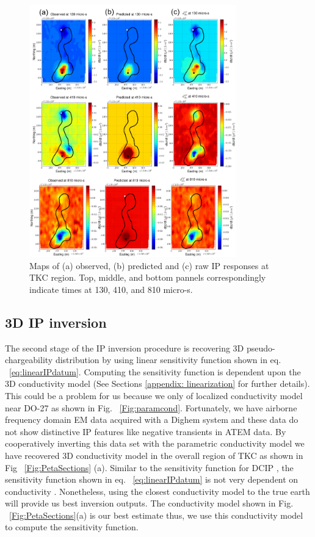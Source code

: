 \documentclass[letterpaper,11pt]{article}
\begin{document}
\begin{figure}[htb]
  \centering
  \includegraphics[width=0.8\textwidth]{figures/decouplemap.png}
  \caption{Maps of (a) observed, (b) predicted and (c) raw IP responses at TKC region. Top, middle, and bottom pannels correspondingly indicate times at 130, 410, and 810 micro-s. }
  \label{Fig:decouplemap}
\end{figure}

\subsection{3D IP inversion}
The second stage of the IP inversion procedure is recovering 3D pseudo-chargeability distribution by using linear sensitivity function shown in eq. ~\ref{eq:linearIPdatum}. Computing the sensitivity function is dependent upon the 3D conductivity model (See Sections \ref{appendix: linearization} for further details). This could be a problem for us because we only of localized conductivity model near DO-27 as shown in Fig. ~\ref{Fig:paramcond}. Fortunately, we have airborne frequency domain EM data acquired with a  Dighem system and these data do not show distinctive IP features like negative transients in ATEM data. By cooperatively inverting this data set with the parametric conductivity model we have recovered 3D conductivity model in the overall region of TKC as shown in Fig ~\ref{Fig:PetaSections} (a). Similar to the sensitivity function for DCIP \cite[]{doug1994}, the  sensitivity function shown in eq. ~\ref{eq:linearIPdatum} is not very dependent on conductivity \cite[]{Kang2015c}. Nonetheless, using the closest conductivity model to the true earth will provide us best inversion outputs. The conductivity model shown in Fig. ~\ref{Fig:PetaSections}(a) is our best estimate thus, we use this conductivity model to compute the sensitivity function. 
\end{document}
